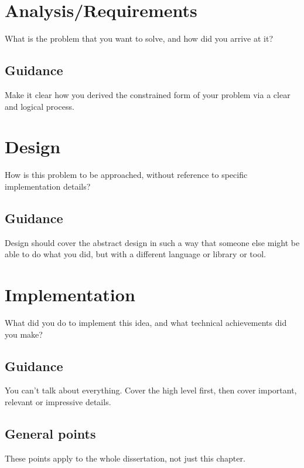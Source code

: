 \documentclass{l4proj}
\begin{document}
\chapter{Analysis/Requirements}
What is the problem that you want to solve, and how did you arrive at it?
\section{Guidance}
Make it clear how you derived the constrained form of your problem via a clear and logical process. 

\chapter{Design}
How is this problem to be approached, without reference to specific implementation details? 
\section{Guidance}
Design should cover the abstract design in such a way that someone else might be able to do what you did, but with a different language or library or tool.

\chapter{Implementation}
What did you do to implement this idea, and what technical achievements did you make?
\section{Guidance}
You can't talk about everything. Cover the high level first, then cover important, relevant or impressive details.



\section{General points}

These points apply to the whole dissertation, not just this chapter.
\end{document}
